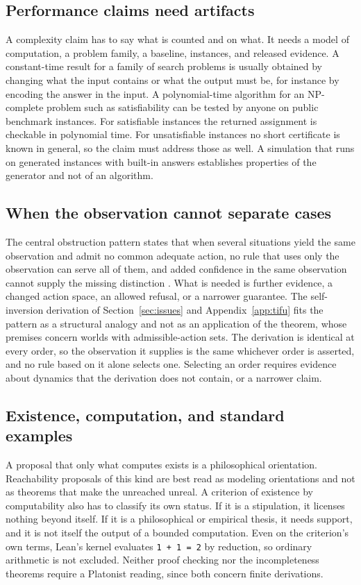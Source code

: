 \documentclass[11pt]{article}
\begin{document}
\subsection{Performance claims need artifacts}

A complexity claim has to say what is counted and on what. It needs a model of computation, a problem family, a baseline, instances, and released evidence. A constant-time result for a family of search problems is usually obtained by changing what the input contains or what the output must be, for instance by encoding the answer in the input. A polynomial-time algorithm for an NP-complete problem such as satisfiability can be tested by anyone on public benchmark instances. For satisfiable instances the returned assignment is checkable in polynomial time. For unsatisfiable instances no short certificate is known in general, so the claim must address those as well. A simulation that runs on generated instances with built-in answers establishes properties of the generator and not of an algorithm.

\subsection{When the observation cannot separate cases}

The central obstruction pattern states that when several situations yield the same observation and admit no common adequate action, no rule that uses only the observation can serve all of them, and added confidence in the same observation cannot supply the missing distinction \cite{flyxion2026ct}. What is needed is further evidence, a changed action space, an allowed refusal, or a narrower guarantee. The self-inversion derivation of Section~\ref{sec:issues} and Appendix~\ref{app:tifu} fits the pattern as a structural analogy and not as an application of the theorem, whose premises concern worlds with admissible-action sets. The derivation is identical at every order, so the observation it supplies is the same whichever order is asserted, and no rule based on it alone selects one. Selecting an order requires evidence about dynamics that the derivation does not contain, or a narrower claim.

\subsection{Existence, computation, and standard examples}

A proposal that only what computes exists is a philosophical orientation. Reachability proposals of this kind are best read as modeling orientations and not as theorems that make the unreached unreal. A criterion of existence by computability also has to classify its own status. If it is a stipulation, it licenses nothing beyond itself. If it is a philosophical or empirical thesis, it needs support, and it is not itself the output of a bounded computation. Even on the criterion's own terms, Lean's kernel evaluates \texttt{1 + 1 = 2} by reduction, so ordinary arithmetic is not excluded. Neither proof checking nor the incompleteness theorems require a Platonist reading, since both concern finite derivations.
\end{document}
